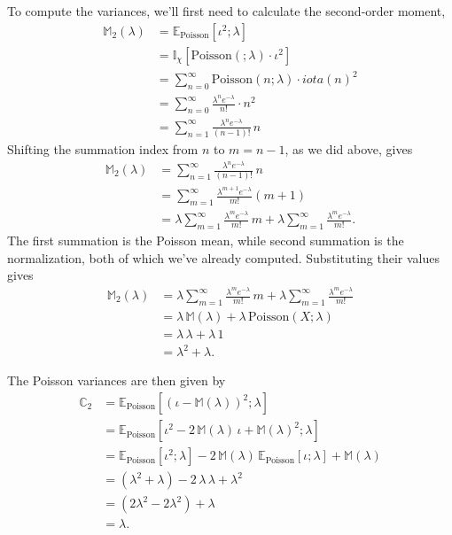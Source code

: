\documentclass[
  letterpaper,
  DIV=11,
  numbers=noendperiod]{scrartcl}
\begin{document}
To compute the variances, we'll first need to calculate the second-order
moment, \begin{align*}
\mathbb{M}_{2}(\lambda)
&=
\mathbb{E}_{\mathrm{Poisson}} [ \iota^{2} ; \lambda ]
\\
&=
\mathbb{I}_{\chi} [ \mathrm{Poisson}( ; \lambda) \cdot \iota^{2} ]
\\
&=
\sum_{n = 0}^{\infty}
\mathrm{Poisson}(n; \lambda) \cdot iota(n)^{2}
\\
&=
\sum_{n = 0}^{\infty}
\frac{ \lambda^{n} e^{-\lambda} }{ n! } \cdot n^{2}
\\
&=
\sum_{n = 1}^{\infty}
\frac{ \lambda^{n} e^{-\lambda} }{ (n - 1)! } \, n
\end{align*} Shifting the summation index from \(n\) to \(m = n - 1\),
as we did above, gives \begin{align*}
\mathbb{M}_{2}(\lambda)
&=
\sum_{n = 1}^{\infty} \frac{ \lambda^{n} e^{-\lambda} }{ (n - 1)! } \, n
\\
&=
\sum_{m = 1}^{\infty}
\frac{ \lambda^{m + 1} e^{-\lambda} }{ m! } (m + 1)
\\
&=
\lambda \sum_{m = 1}^{\infty}
\frac{ \lambda^{m} e^{-\lambda} }{ m! } \, m
+
\lambda \sum_{m = 1}^{\infty}
\frac{ \lambda^{m} e^{-\lambda} }{ m! }.
\end{align*} The first summation is the Poisson mean, while second
summation is the normalization, both of which we've already computed.
Substituting their values gives \begin{align*}
\mathbb{M}_{2}(\lambda)
&=
\lambda \sum_{m = 1}^{\infty}
\frac{ \lambda^{m} e^{-\lambda} }{ m! } \, m
+
\lambda \sum_{m = 1}^{\infty}
\frac{ \lambda^{m} e^{-\lambda} }{ m! }
\\
&=
  \lambda \, \mathbb{M}(\lambda)
+ \lambda \, \mathrm{Poisson}(X; \lambda)
\\
&=
  \lambda \, \lambda
+ \lambda \, 1
\\
&=
\lambda^{2} + \lambda.
\end{align*}

The Poisson variances are then given by \begin{align*}
\mathbb{C}_{2}
&=
\mathbb{E}_{\mathrm{Poisson}} [
  (\iota - \mathbb{M}(\lambda))^{2} ; \lambda
]
\\
&=
\mathbb{E}_{\mathrm{Poisson}}
[
  \iota^{2} - 2 \, \mathbb{M}(\lambda) \, \iota + \mathbb{M}(\lambda)^{2} ; \lambda
]
\\
&=
  \mathbb{E}_{\mathrm{Poisson}} [ \iota^{2} ; \lambda ]
- 2 \, \mathbb{M}(\lambda) \,
  \mathbb{E}_{\mathrm{Poisson}} [ \iota ; \lambda ]
+ \mathbb{M}(\lambda)
\\
&=
   \left( \lambda^{2} + \lambda \right)
-2 \, \lambda \, \lambda
+ \lambda^{2}
\\
&=
(2 \lambda^{2} - 2 \lambda^{2}) + \lambda
\\
&=
\lambda.
\end{align*}
\end{document}
